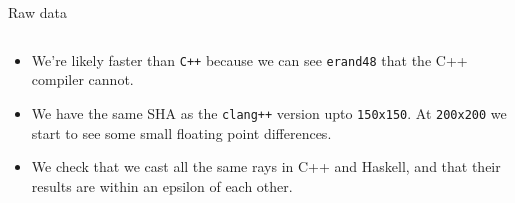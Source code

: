 \documentclass[8pt]{beamer}
\begin{document}
\begin{frame}[fragile]{Raw data}
{\begin{tabular}{lrrrrrrrrrrrrrrrrrrrr}
\hline
\end{tabular}
}
\begin{itemize}
\item We're likely faster than \texttt{C++} because we can see \texttt{erand48} that the C++ compiler cannot.
\item We have the same SHA as the \texttt{clang++} version upto \texttt{150x150}. At \texttt{200x200} we start
      to see some small floating point differences.
\item We check that we cast all the same rays in C++ and Haskell, and that their results are within an epsilon of each other.
\end{itemize}
\end{frame}
\end{document}
